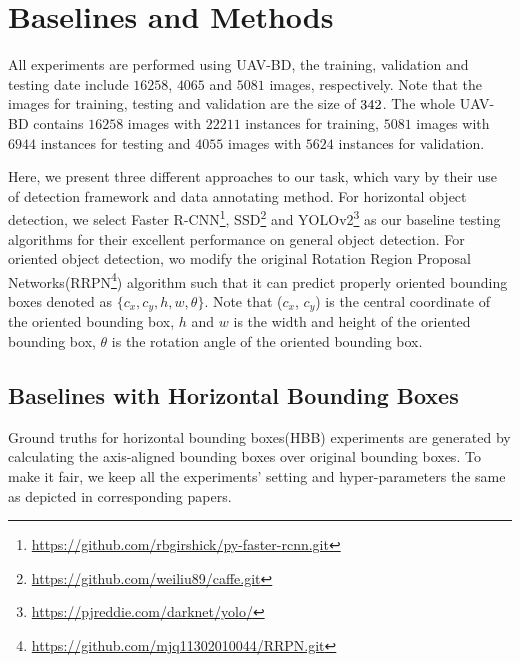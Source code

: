 \section{Baselines and Methods}
\label{sec:exp}


All experiments are performed using UAV-BD, the training, validation and testing date include $ 16258 $, $ 4065 $ and $ 5081 $ images, respectively. Note that the images for training, testing and validation are the size of $ 342 \time 342 $. The whole UAV-BD contains $ 16258 $ images with $ 22211 $ instances for training, $ 5081 $ images with $ 6944 $ instances for testing and $ 4055 $ images with $ 5624 $ instances for validation.


Here, we present three different approaches to our task, which vary by their use of detection framework and data annotating method. For horizontal object detection, we select Faster R-CNN\footnote{\url{https://github.com/rbgirshick/py-faster-rcnn.git}}\cite{FasterRCNN},  SSD\footnote{\url{https://github.com/weiliu89/caffe.git}}\cite{SSD} and YOLOv2\footnote{\url{https://pjreddie.com/darknet/yolo/}}\cite{YOLOv2} as our baseline testing algorithms for their excellent performance on general object detection. For oriented object detection, wo modify the original Rotation Region Proposal Networks(RRPN\footnote{\url{https://github.com/mjq11302010044/RRPN.git}}) algorithm\cite{RRPN} such that it can predict properly oriented bounding boxes denoted as $ \{c_x, c_y, h, w, \theta\} $. Note that ($ c_x $, $ c_y $) is the central coordinate of the oriented bounding box, $ h $ and $ w $ is the width and height of the oriented bounding box, $ \theta $ is the rotation angle of the oriented bounding box.

%	
%	
%	
%	


\subsection{Baselines with Horizontal Bounding Boxes}

Ground truths for horizontal bounding boxes(HBB) experiments are generated by calculating the axis-aligned bounding boxes over original bounding boxes. To make it fair, we keep all the experiments' setting and hyper-parameters the same as depicted in corresponding papers\cite{FasterRCNN, SSD, YOLOv2}.

